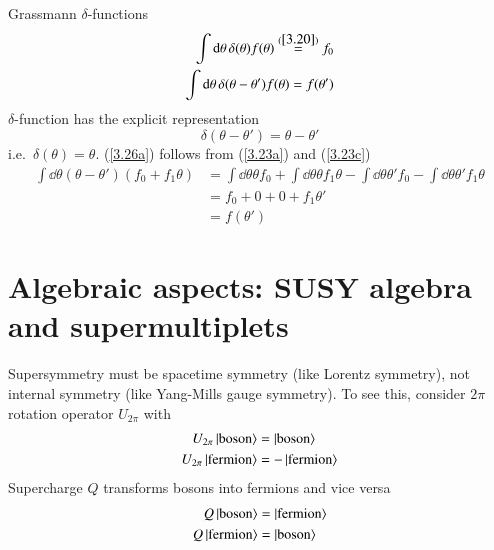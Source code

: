 Grassmann $\delta$-functions
\begin{subequations}
\label{3.26}   
\begin{align}
   \int \dd{\theta} \delta(\theta) f(\theta) \stackrel{(\ref{3.20})}{=} f_0  \label{3.26a}\\
   \int \dd{\theta} \delta(\theta - \theta') f(\theta) = f(\theta')  \label{3.26b}
\end{align}
\end{subequations}
$\delta$-function has the explicit representation
\begin{equation}
   \delta(\theta - \theta') = \theta - \theta' \label{3.27}
\end{equation}
i.e.~$\delta(\theta) = \theta$.
(\ref{3.26a}) follows from (\ref{3.23a}) and (\ref{3.23c})
\begin{align*}
   \int \dd{\theta} (\theta - \theta') (f_0 + f_1 \theta) &= \int \dd{\theta} \theta f_0 + \int \dd{\theta} \theta f_1 \theta - \int \dd{\theta} \theta' f_0 - \int \dd{\theta} \theta' f_1 \theta  \\
                                                          &= f_0 + 0 + 0 + f_1\theta' \\
                                                          &= f(\theta')
\end{align*}
\section{Algebraic aspects: SUSY algebra and supermultiplets}
Supersymmetry must be spacetime symmetry (like Lorentz symmetry), not internal symmetry (like Yang-Mills gauge symmetry). To see this, consider $2\pi$ rotation operator $U_{2\pi}$ with
\begin{subequations}
   \label{3.28}
\begin{align}
   U_{2\pi} \ket{\text{boson}} &= \ket{\text{boson}} \label{3.28a} \\
   U_{2\pi} \ket{\text{fermion}} &= -\ket{\text{fermion}} \label{3.28b}
\end{align}
\end{subequations}
Supercharge $Q$ transforms bosons into fermions and vice versa
\begin{subequations}
   \label{3.29}
\begin{align}
   Q \ket{\text{boson}} &= \ket{\text{fermion}} \label{3.29a} \\
   Q \ket{\text{fermion}} &= \ket{\text{boson}} \label{3.29b}
\end{align}
\end{subequations}


